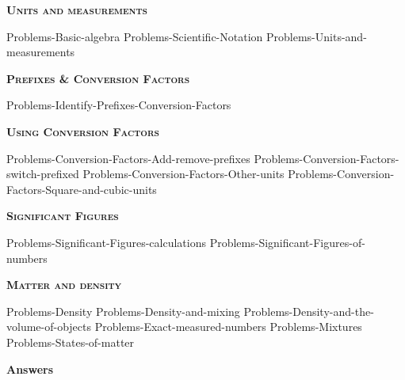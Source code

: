 \documentclass[main.tex]{subfiles}
\begin{document}
\newpage
\setdoublesep{0.35700 em}  %
\setatomsep{1.78500 em}    %
\setbondoffset{0.18265 em} %
\newcommand{\bondwidth}{0.06642 em} %
\setbondstyle{line width = \bondwidth}
\fancyhfoffset[E,O]{0pt}
\setlength{\columnsep}{30pt}
\begin{conclusion}
\end{conclusion}
\begin{multicols*}{2}\setcounter{numA}{1}



{\raggedright\textsc{\textbf{Units and measurements }}\par}
{Problems-Basic-algebra}
{Problems-Scientific-Notation}
{Problems-Units-and-measurements}


{\raggedright\textsc{\textbf{Prefixes \& Conversion Factors }}\par}
{Problems-Identify-Prefixes-Conversion-Factors}




{\raggedright\textsc{\textbf{Using Conversion Factors }}\par}
{Problems-Conversion-Factors-Add-remove-prefixes}
{Problems-Conversion-Factors-switch-prefixed}
{Problems-Conversion-Factors-Other-units}
{Problems-Conversion-Factors-Square-and-cubic-units}
{\raggedright\textsc{\textbf{Significant Figures }}\par}
{Problems-Significant-Figures-calculations}
{Problems-Significant-Figures-of-numbers}
{\raggedright\textsc{\textbf{Matter and density }}\par}
{Problems-Density}
{Problems-Density-and-mixing}
{Problems-Density-and-the-volume-of-objects}
{Problems-Exact-measured-numbers}
{Problems-Mixtures}
{Problems-States-of-matter}












\end{multicols*}

\newpage
\begin{answersenvironment}
\begin{minipage}[c]{1\textwidth}
\begin{localsize}{10}
{\Large \bf Answers}
\printsolutions 
\end{localsize}
\end{minipage}\end{answersenvironment}
\end{document}
